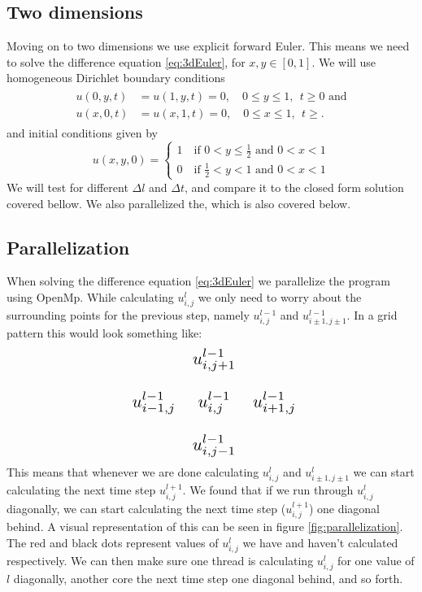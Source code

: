 \documentclass[reprint, english,notitlepage,nofootinbib]{revtex4-1}  %
\begin{document}
\subsection{Two dimensions}
Moving on to two dimensions we use explicit forward Euler. This means we need to solve the difference equation \eqref{eq:3dEuler}, for $x, y \in [0,1]$. We will use homogeneous Dirichlet boundary conditions
\begin{align}
	\label{eq:2D_bound}
	\begin{split}
	u(0, y, t) &= u(1, y, t) = 0, \quad 0\leq y \leq 1, \ \ t\geq 0 \text{ and}\\
	u(x, 0, t) &= u(x, 1, t) = 0, \quad 0\leq x \leq 1, \ \ t\geq.
	\end{split}
\end{align}
and initial conditions given by
\begin{equation}
\label{eq:2D_init}
	u(x,y,0) =
	\begin{cases}
	1\quad \text{if }0<y\leq \frac{1}{2}\text{ and } 0<x<1 \\
	0\quad \text{if }\frac{1}{2}<y<1\text{ and } 0<x<1
	\end{cases}
\end{equation}
We will test for different $\Delta l$ and $\Delta t$, and compare it to the closed form solution covered bellow. We also parallelized the, which is also covered below.

\subsection*{Parallelization}
When solving the difference equation \eqref{eq:3dEuler} we parallelize the program using OpenMp. While calculating $u_{i,j}^l$ we only need to worry about the surrounding points for the previous step, namely $u_{i,j}^{l-1}$ and $u_{i\pm 1,j\pm 1}^{l-1}$. In a grid pattern this would look something like:
\begin{equation*}
\scalebox{1.5}{
	$\begin{matrix}
	& u_{i,j+1}^{l-1} & \\
	\\
	u_{i-1,j}^{l-1} & u_{i,j}^{l-1} & u_{i+1,j}^{l-1} \\
	\\
	& u_{i,j-1}^{l-1} &
	\end{matrix}$}
\end{equation*}
This means that whenever we are done calculating $u_{i,j}^{l}$ and $u_{i\pm 1,j\pm 1}^{l}$ we can start calculating the next time step $u_{i,j}^{l+1}$. We found that if we run through $u_{i,j}^{l}$ diagonally, we can start calculating the next time step ($u_{i,j}^{l+1}$) one diagonal behind. A visual representation of this can be seen in figure \ref{fig:parallelization}. The red and black dots represent values of $u_{i,j}^l$ we have and haven't calculated respectively. We can then make sure one thread is calculating $u_{i,j}^l$ for one value of $l$ diagonally, another core the next time step one diagonal behind, and so forth.
\end{document}
